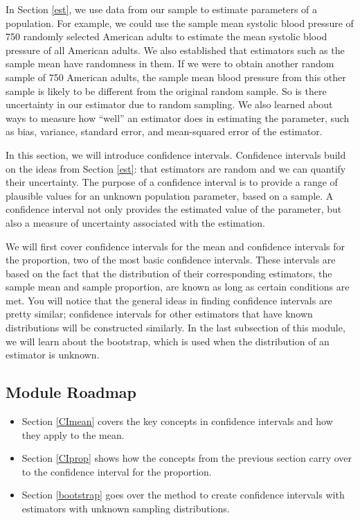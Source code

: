 \documentclass[
]{book}
\providecommand{\tightlist}{%
  \setlength{\itemsep}{0pt}\setlength{\parskip}{0pt}}
\begin{document}
In Section \ref{est}, we use data from our sample to estimate parameters of a population. For example, we could use the sample mean systolic blood pressure of 750 randomly selected American adults to estimate the mean systolic blood pressure of all American adults. We also established that estimators such as the sample mean have randomness in them. If we were to obtain another random sample of 750 American adults, the sample mean blood pressure from this other sample is likely to be different from the original random sample. So is there uncertainty in our estimator due to random sampling. We also learned about ways to measure how ``well'' an estimator does in estimating the parameter, such as bias, variance, standard error, and mean-squared error of the estimator.

In this section, we will introduce confidence intervals. Confidence intervals build on the ideas from Section \ref{est}: that estimators are random and we can quantify their uncertainty. The purpose of a confidence interval is to provide a range of plausible values for an unknown population parameter, based on a sample. A confidence interval not only provides the estimated value of the parameter, but also a measure of uncertainty associated with the estimation.

We will first cover confidence intervals for the mean and confidence intervals for the proportion, two of the most basic confidence intervals. These intervals are based on the fact that the distribution of their corresponding estimators, the sample mean and sample proportion, are known as long as certain conditions are met. You will notice that the general ideas in finding confidence intervals are pretty similar; confidence intervals for other estimators that have known distributions will be constructed similarly. In the last subsection of this module, we will learn about the bootstrap, which is used when the distribution of an estimator is unknown.

\hypertarget{module-roadmap-6}{%
\subsection{Module Roadmap}\label{module-roadmap-6}}

\begin{itemize}
\tightlist
\item
  Section \ref{CImean} covers the key concepts in confidence intervals and how they apply to the mean.
\item
  Section \ref{CIprop} shows how the concepts from the previous section carry over to the confidence interval for the proportion.
\item
  Section \ref{bootstrap} goes over the method to create confidence intervals with estimators with unknown sampling distributions.
\end{itemize}
\end{document}
